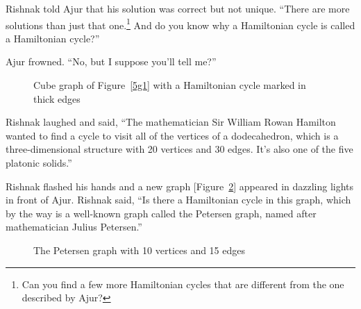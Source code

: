 Rishnak told Ajur that his solution was correct but not unique.  ``There are more solutions than just that one.\footnote{Can you find a few more Hamiltonian cycles that are different from the one described by Ajur?} And do you know why a Hamiltonian cycle is called a Hamiltonian cycle?''

Ajur frowned. ``No, but I suppose you'll tell me?''

\begin{figure}
\begin{center}
\caption{Cube graph of Figure~\ref{5g1} with a Hamiltonian cycle marked in thick edges}\label{5g2}
\end{center}
\end{figure}

Rishnak laughed and said, ``The mathematician Sir William Rowan Hamilton wanted to find a cycle to visit all of the vertices of a dodecahedron, which is a three-dimensional structure with 20 vertices and 30 edges. It's also one of the five platonic solids.''

Rishnak flashed his hands and a new graph [Figure~\ref{5g3}] appeared in dazzling lights in front of Ajur. Rishnak said, ``Is there a Hamiltonian cycle in this graph, which by the way is a well-known graph called the Petersen graph, named after mathematician Julius Petersen.''

\begin{figure}
\begin{center}
\caption{The Petersen graph with 10 vertices and 15 edges}\label{5g3}
\end{center}
\end{figure}

